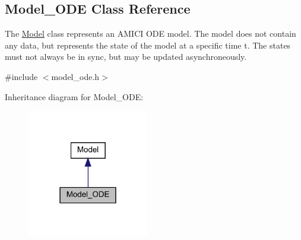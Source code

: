 \hypertarget{classamici_1_1_model___o_d_e}{}\subsection{Model\+\_\+\+O\+DE Class Reference}
\label{classamici_1_1_model___o_d_e}


The \mbox{\hyperlink{classamici_1_1_model}{Model}} class represents an A\+M\+I\+CI O\+DE model. The model does not contain any data, but represents the state of the model at a specific time t. The states must not always be in sync, but may be updated asynchroneously.  




{\ttfamily \#include $<$model\+\_\+ode.\+h$>$}



Inheritance diagram for Model\+\_\+\+O\+DE\+:
\nopagebreak
\begin{figure}[H]
\begin{center}
\leavevmode
\includegraphics[width=150pt]{classamici_1_1_model___o_d_e__inherit__graph}
\end{center}
\end{figure}

